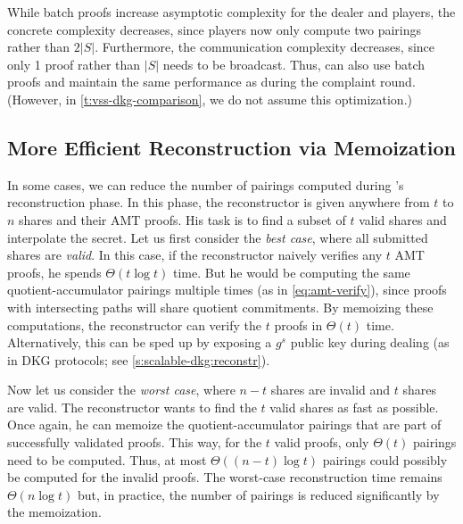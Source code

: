 While batch proofs increase asymptotic complexity for the dealer and players, the concrete complexity decreases, since players now only compute two pairings rather than $2|S|$.
Furthermore, the communication complexity decreases, since only 1 proof rather than $|S|$ needs to be broadcast.
Thus, \ourvss can also use batch proofs and maintain the same performance as \evss during the complaint round.
(However, in \cref{t:vss-dkg-comparison}, we do not assume this optimization.)


\subsection{More Efficient Reconstruction via Memoization}
\label{s:scalable-vss:reconstruction}
In some cases, we can reduce the number of pairings computed during \ourvss's reconstruction phase.
In this phase, the reconstructor is given anywhere from $t$ to $n$ shares and their AMT proofs.
His task is to find a subset of $t$ valid shares and interpolate the secret.
Let us first consider the \textit{best case}, where all submitted shares are \textit{valid}.
In this case, if the reconstructor naively verifies any $t$ AMT proofs, he spends $\Theta(t\log{t})$ time.
But he would be computing the same quotient-accumulator pairings multiple times (as in \cref{eq:amt-verify}), since proofs with intersecting paths will share quotient commitments.
By memoizing these computations, the reconstructor can verify the $t$ proofs in $\Theta(t)$ time.
Alternatively, this can be sped up by exposing a $g^s$ public key during dealing (as in DKG protocols; see \cref{s:scalable-dkg:reconstr}).

Now let us consider the \textit{worst case}, where $n-t$ shares are invalid and $t$ shares are valid.
The reconstructor wants to find the $t$ valid shares as fast as possible.
Once again, he can memoize the quotient-accumulator pairings that are part of successfully validated proofs.
This way, for the $t$ valid proofs, only $\Theta(t)$ pairings need to be computed.
Thus, at most $\Theta((n-t)\log{t})$ pairings could possibly be computed for the invalid proofs.
The worst-case reconstruction time remains $\Theta(n\log{t})$ but, in practice, the number of pairings is reduced significantly by the memoization.

